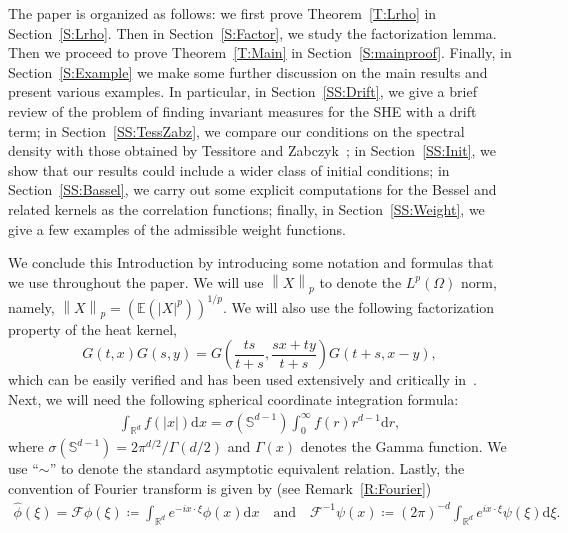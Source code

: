 \documentclass[a4paper,11pt]{article}%
\theoremstyle{plain}
\theoremstyle{definition}
\numberwithin{equation}{section}
\newcommand{\R}{\mathbb{R}}
\newcommand{\Norm}[1]{\left\| #1 \right\|}
\newcommand{\ud}{\ensuremath{\mathrm{d}}}
\begin{document}
The paper is organized as follows: we first prove Theorem~\ref{T:Lrho} in Section~\ref{S:Lrho}. Then
in Section~\ref{S:Factor}, we study the factorization lemma. Then we proceed to prove
Theorem~\ref{T:Main} in Section~\ref{S:mainproof}. Finally, in Section~\ref{S:Example} we make some
further discussion on the main results and present various examples. In particular, in
Section~\ref{SS:Drift}, we give a brief review of the problem of finding invariant measures for the SHE
with a drift term; in Section~\ref{SS:TessZabz}, we compare our conditions on the spectral density
with those obtained by Tessitore and Zabczyk~\cite{tessitore.zabczyk:98:invariant}; in
Section~\ref{SS:Init}, we show that our results could include a wider class of initial conditions;
in Section~\ref{SS:Bassel}, we carry out some explicit computations for the Bessel and related
kernels as the correlation functions; finally, in Section~\ref{SS:Weight}, we give a few examples of
the admissible weight functions.

\bigskip

We conclude this Introduction by introducing some notation and formulas that we use throughout the
paper. We will use $\Norm{X}_p$ to denote the $L^p (\Omega)$ norm, namely,
$\Norm{X}_p = \left(\mathbb{E}(|X|^p)\right)^{1/p}$. We will also use the following factorization
property of the heat kernel,
\begin{equation}\label{E:gsim}
  G(t,x)G(s,y) = G\left(\frac{ts}{t+s}, \frac{sx + ty}{t+s}\right)G\left(t+s, x-y\right),
\end{equation}
which can be easily verified and has been used extensively and critically
in~\cite{chen.dalang:15:moments*1,chen.kim:19:nonlinear,chen.huang:19:comparison}. Next, we will
need the following spherical coordinate integration formula:
\begin{align*}
  \int_{\R^d} f(|x|) \ud x = \sigma(\mathbb{S}^{d-1}) \int_0^\infty f(r) r^{d-1} \ud r,
\end{align*}
where $\sigma(\mathbb{S}^{d-1}) = 2\pi^{d/2} / \Gamma(d/2)$ and $\Gamma(x)$ denotes the Gamma
function. We use ``$\sim$'' to denote the standard asymptotic equivalent relation. Lastly, the
convention of Fourier transform is given by (see Remark~\ref{R:Fourier})
\begin{align}\label{E:Fourier}
  \widehat{\phi}(\xi) = \mathcal{F}\phi(\xi) \coloneqq \int_{\R^d} e^{-i x\cdot\xi} \phi(x)\ud x \quad \text{and} \quad
  \mathcal{F}^{-1}\psi(x) \coloneqq (2\pi)^{-d} \int_{\R^d} e^{i x\cdot\xi} \psi(\xi)\ud \xi.
\end{align}
\end{document}
